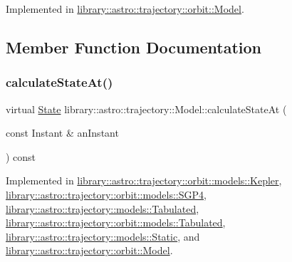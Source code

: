 Implemented in \hyperlink{classlibrary_1_1astro_1_1trajectory_1_1orbit_1_1_model_a1d580725a826a6d16d2c3d4cf2022a50}{library\+::astro\+::trajectory\+::orbit\+::\+Model}.



\subsection{Member Function Documentation}
\mbox{\label{classlibrary_1_1astro_1_1trajectory_1_1_model_acee9ee770c2ee1d1205b618e8f722ba4}} 
\subsubsection{\texorpdfstring{calculate\+State\+At()}{calculateStateAt()}}
{\footnotesize\ttfamily virtual \hyperlink{classlibrary_1_1astro_1_1trajectory_1_1_state}{State} library\+::astro\+::trajectory\+::\+Model\+::calculate\+State\+At (\begin{DoxyParamCaption}\item[{const Instant \&}]{an\+Instant }\end{DoxyParamCaption}) const\hspace{0.3cm}{\ttfamily [pure virtual]}}



Implemented in \hyperlink{classlibrary_1_1astro_1_1trajectory_1_1orbit_1_1models_1_1_kepler_a6354b3545decf1179289383679ebe2cd}{library\+::astro\+::trajectory\+::orbit\+::models\+::\+Kepler}, \hyperlink{classlibrary_1_1astro_1_1trajectory_1_1orbit_1_1models_1_1_s_g_p4_a5d94d349c464f7313017c795a9346084}{library\+::astro\+::trajectory\+::orbit\+::models\+::\+S\+G\+P4}, \hyperlink{classlibrary_1_1astro_1_1trajectory_1_1models_1_1_tabulated_a6d23f5721930d9e885eb3b763ab3390a}{library\+::astro\+::trajectory\+::models\+::\+Tabulated}, \hyperlink{classlibrary_1_1astro_1_1trajectory_1_1orbit_1_1models_1_1_tabulated_a43db203d7257d25a5a3a6f0e03e62b7d}{library\+::astro\+::trajectory\+::orbit\+::models\+::\+Tabulated}, \hyperlink{classlibrary_1_1astro_1_1trajectory_1_1models_1_1_static_ae4bc6aceab498868e4ebe2a65c6aa413}{library\+::astro\+::trajectory\+::models\+::\+Static}, and \hyperlink{classlibrary_1_1astro_1_1trajectory_1_1orbit_1_1_model_a34198a504836b9779425da99d964d19c}{library\+::astro\+::trajectory\+::orbit\+::\+Model}.

